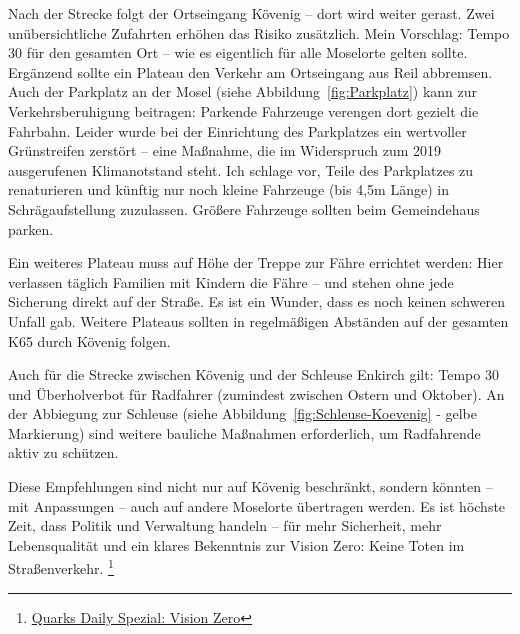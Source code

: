 Nach der Strecke folgt der Ortseingang Kövenig – dort wird weiter gerast. Zwei unübersichtliche Zufahrten erhöhen das Risiko zusätzlich. Mein Vorschlag: Tempo 30 für den gesamten Ort – wie es eigentlich für alle Moselorte gelten sollte. Ergänzend sollte ein Plateau den Verkehr am Ortseingang aus Reil abbremsen. Auch der Parkplatz an der Mosel (siehe Abbildung~\ref{fig:Parkplatz}) kann zur Verkehrsberuhigung beitragen: Parkende Fahrzeuge verengen dort gezielt die Fahrbahn. Leider wurde bei der Einrichtung des Parkplatzes ein wertvoller Grünstreifen zerstört – eine Maßnahme, die im Widerspruch zum 2019 ausgerufenen Klimanotstand steht. Ich schlage vor, Teile des Parkplatzes zu renaturieren und künftig nur noch kleine Fahrzeuge (bis 4,5m Länge) in Schrägaufstellung zuzulassen. Größere Fahrzeuge sollten beim Gemeindehaus parken.

Ein weiteres Plateau muss auf Höhe der Treppe zur Fähre errichtet werden: Hier verlassen täglich Familien mit Kindern die Fähre – und stehen ohne jede Sicherung direkt auf der Straße. Es ist ein Wunder, dass es noch keinen schweren Unfall gab. Weitere Plateaus sollten in regelmäßigen Abständen auf der gesamten K65 durch Kövenig folgen.

Auch für die Strecke zwischen Kövenig und der Schleuse Enkirch gilt: Tempo 30 und Überholverbot für Radfahrer (zumindest zwischen Ostern und Oktober). An der Abbiegung zur Schleuse (siehe Abbildung~\ref{fig:Schleuse-Koevenig} - gelbe Markierung) sind weitere bauliche Maßnahmen erforderlich, um Radfahrende aktiv zu schützen.

Diese Empfehlungen  sind nicht nur auf Kövenig beschränkt, sondern könnten – mit Anpassungen – auch auf andere Moselorte übertragen werden. Es ist höchste Zeit, dass Politik und Verwaltung handeln – für mehr Sicherheit, mehr Lebensqualität und ein klares Bekenntnis zur Vision Zero: Keine Toten im Straßenverkehr. \footnote{\href{https://www.quarks.de/podcast/vision-zero-ist-verkehr-ohne-tote-machbar-quarks-daily-spezial/}{Quarks Daily Spezial: Vision Zero}}


